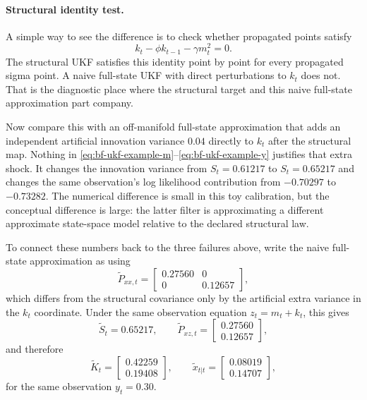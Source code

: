 \paragraph{Structural identity test.}
A simple way to see the difference is to check whether propagated points satisfy
\[
  k_t - \phi k_{t-1} - \gamma m_t^2 = 0.
\]
The structural UKF satisfies this identity point by point for every propagated
sigma point.  A naive full-state UKF with direct perturbations to $k_t$ does
not.  That is the diagnostic place where the structural target and this naive
full-state approximation part company.

Now compare this with an off-manifold full-state approximation that adds an
independent artificial innovation variance $0.04$ directly to $k_t$ after the
structural map.  Nothing in
\eqref{eq:bf-ukf-example-m}--\eqref{eq:bf-ukf-example-y} justifies that extra
shock.  It changes the innovation variance from $S_t=0.61217$ to
$S_t=0.65217$ and changes the same observation's log likelihood contribution
from $-0.70297$ to $-0.73282$.  The numerical difference is small in this toy
calibration, but the conceptual difference is large: the latter filter is
approximating a different approximate state-space model relative to the
declared structural law.

To connect these numbers back to the three failures above, write the naive
full-state approximation as using
\[
  \tilde P_{xx,t}
  =
  \begin{bmatrix}
    0.27560 & 0\\
    0 & 0.12657
  \end{bmatrix},
\]
which differs from the structural covariance only by the artificial extra
variance in the $k_t$ coordinate.  Under the same observation equation
$z_t=m_t+k_t$, this gives
\[
  \tilde S_t = 0.65217,
  \qquad
  \tilde P_{xz,t} =
  \begin{bmatrix}
    0.27560\\ 0.12657
  \end{bmatrix},
\]
and therefore
\[
  \tilde K_t
  =
  \begin{bmatrix}
    0.42259\\ 0.19408
  \end{bmatrix},
  \qquad
  \tilde x_{t|t}
  =
  \begin{bmatrix}
    0.08019\\ 0.14707
  \end{bmatrix},
\]
for the same observation $y_t=0.30$.

